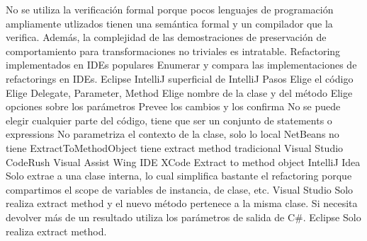No se utiliza la verificación formal porque pocos lenguajes de programación ampliamente utlizados
    tienen una semántica formal y un compilador que la verifica. Además, la complejidad de las
    demostraciones de preservación de comportamiento para transformaciones no triviales es
    intratable. Refactoring implementados en IDEs populares Enumerar y compara las implementaciones
    de refactorings en IDEs. Eclipse IntelliJ
    superficial de IntelliJ Pasos Elige el código Elige Delegate, Parameter, Method Elige nombre de
    la clase y del método Elige opciones sobre los parámetros Prevee los cambios y los confirma No
    se puede elegir cualquier parte del código, tiene que ser un conjunto de statements o
    expressions No parametriza el contexto de la clase, solo lo local NetBeans no tiene
    ExtractToMethodObject tiene extract method tradicional Visual Studio CodeRush Visual Assist Wing
    IDE XCode Extract to method object IntelliJ Idea Solo extrae a una clase interna, lo cual
    simplifica bastante el refactoring porque compartimos el scope de variables de instancia, de
    clase, etc. Visual Studio Solo realiza extract method y el nuevo método pertenece a la misma
    clase. Si necesita devolver más de un resultado utiliza los parámetros de salida de C\#. Eclipse
    Solo realiza extract method.